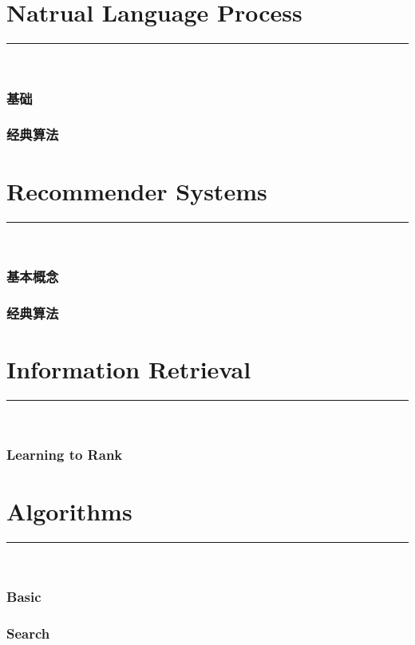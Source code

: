 \documentclass{article}
\begin{document}
\clearpage
\part{Natrual Language Process}
{\noindent}	 \rule[-10pt]{17.5cm}{0.5em}\\
\section{基础}


\section{经典算法}



\clearpage
\part{Recommender Systems}
{\noindent}	 \rule[-10pt]{17.5cm}{0.5em}\\
\section{基本概念}


\section{经典算法}



\clearpage
\part{Information Retrieval}
{\noindent}	 \rule[-10pt]{17.5cm}{0.5em}\\
\section{Learning to Rank}



\clearpage
\part{Algorithms}
{\noindent}	 \rule[-10pt]{17.5cm}{0.5em}\\
\section{Basic}

\section{Search}

\end{document}
